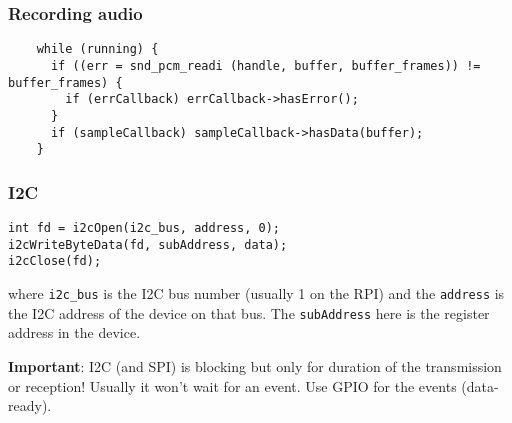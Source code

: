 \documentclass[xcolor=dvipsnames]{beamer}
\begin{document}
\begin{frame}[fragile]
    \frametitle{Recording audio}
\begin{verbatim}
    while (running) {
      if ((err = snd_pcm_readi (handle, buffer, buffer_frames)) != buffer_frames) {
        if (errCallback) errCallback->hasError();
      }
      if (sampleCallback) sampleCallback->hasData(buffer);
    }
   \end{verbatim}
\end{frame}



\begin{frame}[fragile]
    \frametitle{I2C}
\begin{verbatim}
int fd = i2cOpen(i2c_bus, address, 0);
i2cWriteByteData(fd, subAddress, data);
i2cClose(fd);
\end{verbatim}
where \texttt{i2c\_bus} is the I2C bus number (usually 1 on the RPI)
and the \texttt{address} is the I2C address of the device on that bus.
The \texttt{subAddress} here is the register address in the device.


\textbf{Important}: I2C (and SPI) is blocking but only for duration of the transmission or reception!
Usually it won't wait for an event. Use GPIO for the events (data-ready).
\end{frame}
\end{document}
